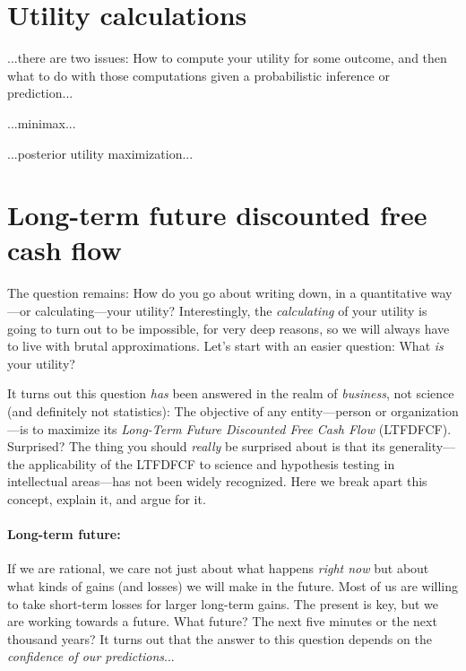 \documentclass[12pt,twoside,pdftex]{article}
\begin{document}
\section{Utility calculations}

...there are two issues: How to compute your utility for some outcome,
and then what to do with those computations given a probabilistic
inference or prediction...

...minimax...

...posterior utility maximization...

\section{Long-term future discounted free cash flow}

The question remains: How do you go about writing down, in a
quantitative way---or calculating---your utility?  Interestingly, the
\emph{calculating} of your utility is going to turn out to be
impossible, for very deep reasons, so we will always have to live with
brutal approximations.  Let's start with an easier question: What
\emph{is} your utility?

It turns out this question \emph{has} been
answered in the realm of \emph{business},
not science (and definitely not statistics):
The objective of any entity---person or organization---is to maximize
its \emph{Long-Term Future Discounted Free Cash Flow} (LTFDFCF).
Surprised?  The thing you should \emph{really} be surprised about is
that its generality---the applicability of the LTFDFCF to science and
hypothesis testing in intellectual areas---has not been widely
recognized.  Here we break apart this concept, explain it, and argue
for it.

\paragraph{Long-term future:}
If we are rational, we care not just about what happens \emph{right
now} but about what kinds of gains (and losses) we will make in the
future.  Most of us are willing to take short-term losses for larger
long-term gains.  The present is key, but we are working towards a
future.  What future?  The next five minutes or the next thousand
years?  It turns out that the answer to this question depends on the
\emph{confidence of our predictions}...
\end{document}
